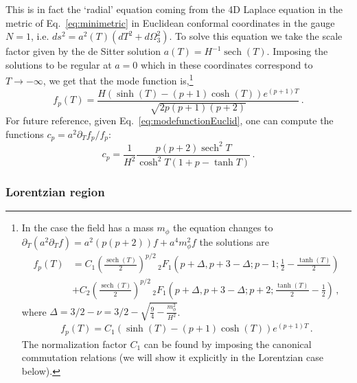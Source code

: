 \documentclass[a4paper,11pt]{article}
\numberwithin{equation}{section}
\DeclareMathOperator{\sech}{sech}
\numberwithin{equation}{section}
\begin{document}
This is in fact the ‘radial’ equation coming from the 4D Laplace equation in the metric of Eq.~\eqref{eq:minimetric} in Euclidean conformal coordinates in the gauge $N=1$, i.e. $ds^2=a^2(T)(dT^2+d\Omega_3^2)$. To solve this equation we take  the scale factor  given by the de Sitter solution  $a(T)=H^{-1}\sech(T)$. Imposing the solutions to be regular at $a=0$ which in these coordinates correspond to $T\to-\infty$, we get that the mode function is,\footnote{In the case the field has a mass $m_\phi$ the equation  changes to $\partial_T\left(a^2 \partial_T f\right)=a^2(p(p+2))f+ a^4 m_\phi^2 f$ the solutions are
\begin{align}
f_p(T)&=C_1 \left(\frac{\sech(T)}{2}\right)^{p/2} \, _2F_1\left(p+\Delta,p+3-\Delta;p-1;\frac{1}{2} -\frac{\tanh (T)}{2}\right)\nonumber\\&+C_2 \left(\frac{\sech(T)}{2}\right)^{p/2} \, _2F_1\left(p+\Delta,p+3-\Delta;p+2; \frac{\tanh (T)}{2}-\frac{1}{2}\right) \,,
\end{align}
where $\Delta=3/2-\nu=3/2-\sqrt{\frac{9}{4}-\frac{m_\phi^2}{H^2}}$.
\begin{align}
f_p(T)=C_1(\sinh(T)-(p+1)\cosh(T))e^{(p+1)T} \,.
\end{align}
The normalization factor $C_1$ can be found by imposing the canonical commutation relations (we will show it explicitly in the Lorentzian case below).}
\begin{equation}
\label{eq:modefunctionEuclid}
f_p(T) = \frac{H (\sinh(T)-(p+1)\cosh(T))e^{(p+1)T}}{\sqrt{2p(p+1)(p+2)}} \,.
\end{equation}
For future reference, given Eq.~\eqref{eq:modefunctionEuclid}, one can compute the functions $c_p = a^2 \partial_T f_p/f_p$:
\begin{equation}
\label{eq:clE}
c_p = \frac{1}{H^2} \frac{p (p+2)\sech^2 T}{\cosh^2 T (1 + p - \tanh T)} \,.
\end{equation}

\subsubsection*{Lorentzian region}
\end{document}
